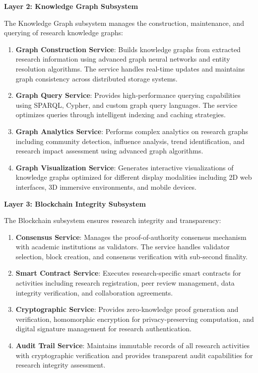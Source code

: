 \documentclass[10pt,twocolumn]{article}
\begin{document}
\textbf{Layer 2: Knowledge Graph Subsystem}

The Knowledge Graph subsystem manages the construction, maintenance, and querying of research knowledge graphs:

\begin{enumerate}
    \item \textbf{Graph Construction Service}: Builds knowledge graphs from extracted research information using advanced graph neural networks and entity resolution algorithms. The service handles real-time updates and maintains graph consistency across distributed storage systems.
    
    \item \textbf{Graph Query Service}: Provides high-performance querying capabilities using SPARQL, Cypher, and custom graph query languages. The service optimizes queries through intelligent indexing and caching strategies.
    
    \item \textbf{Graph Analytics Service}: Performs complex analytics on research graphs including community detection, influence analysis, trend identification, and research impact assessment using advanced graph algorithms.
    
    \item \textbf{Graph Visualization Service}: Generates interactive visualizations of knowledge graphs optimized for different display modalities including 2D web interfaces, 3D immersive environments, and mobile devices.
\end{enumerate}

\textbf{Layer 3: Blockchain Integrity Subsystem}

The Blockchain subsystem ensures research integrity and transparency:

\begin{enumerate}
    \item \textbf{Consensus Service}: Manages the proof-of-authority consensus mechanism with academic institutions as validators. The service handles validator selection, block creation, and consensus verification with sub-second finality.
    
    \item \textbf{Smart Contract Service}: Executes research-specific smart contracts for activities including research registration, peer review management, data integrity verification, and collaboration agreements.
    
    \item \textbf{Cryptographic Service}: Provides zero-knowledge proof generation and verification, homomorphic encryption for privacy-preserving computation, and digital signature management for research authentication.
    
    \item \textbf{Audit Trail Service}: Maintains immutable records of all research activities with cryptographic verification and provides transparent audit capabilities for research integrity assessment.
\end{enumerate}
\end{document}
